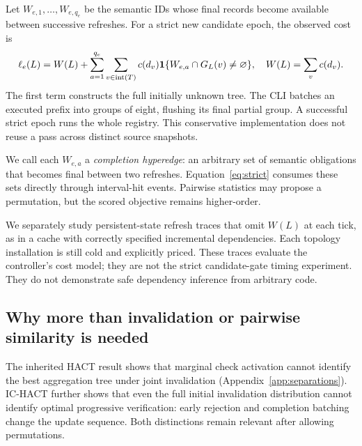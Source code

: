 \documentclass[11pt]{article}
\theoremstyle{definition}\newtheorem{definition}[theorem]{Definition}
\begin{document}
Let $W_{e,1},\ldots,W_{e,q_e}$ be the semantic IDs whose final records become available between successive refreshes. For a strict new candidate epoch, the observed cost is
\begin{equation}\label{eq:strict}
 \ell_e(L)=W(L)+\sum_{a=1}^{q_e}\sum_{v\in\operatorname{int}(T)}
 c(d_v)\mathbf 1\{W_{e,a}\cap G_L(v)\ne\varnothing\},\quad
 W(L)=\sum_v c(d_v).
\end{equation}
The first term constructs the full initially unknown tree. The CLI batches an executed prefix into groups of eight, flushing its final partial group. A successful strict epoch runs the whole registry. This conservative implementation does not reuse a pass across distinct source snapshots.

We call each $W_{e,a}$ a \emph{completion hyperedge}: an arbitrary set of semantic obligations that becomes final between two refreshes. Equation~\eqref{eq:strict} consumes these sets directly through interval-hit events. Pairwise statistics may propose a permutation, but the scored objective remains higher-order.

We separately study persistent-state refresh traces that omit $W(L)$ at each tick, as in a cache with correctly specified incremental dependencies. Each topology installation is still cold and explicitly priced. These traces evaluate the controller's cost model; they are not the strict candidate-gate timing experiment. They do not demonstrate safe dependency inference from arbitrary code.

\subsection{Why more than invalidation or pairwise similarity is needed}
The inherited HACT result shows that marginal check activation cannot identify the best aggregation tree under joint invalidation (Appendix~\ref{app:separations}). IC-HACT further shows that even the full initial invalidation distribution cannot identify optimal progressive verification: early rejection and completion batching change the update sequence. Both distinctions remain relevant after allowing permutations.
\end{document}
